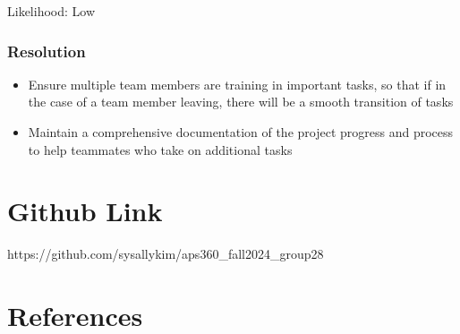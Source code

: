\documentclass{article} %
\begin{document}
Likelihood: Low
\subsubsection*{Resolution}
\begin{itemize}
    \item Ensure multiple team members are training in important tasks, so that if in the case of a team member leaving, there will be a smooth transition of tasks
    \item Maintain a comprehensive documentation of the project progress and process to help teammates who take on additional tasks
\end{itemize}

\section{Github Link}
https://github.com/sysallykim/aps360\_fall2024\_group28

\section{References}

\label{last_page}



\end{document}
